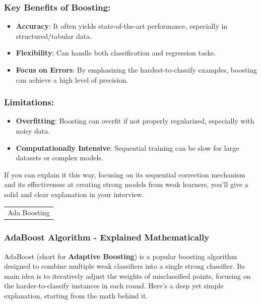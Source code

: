 \documentclass[12pt]{book}
\providecommand{\tightlist}{%
  \setlength{\itemsep}{0pt}\setlength{\parskip}{0pt}}
\begin{document}
\subsubsection{Key Benefits of
Boosting:}\label{key-benefits-of-boosting}

\begin{itemize}
\tightlist
\item
  \textbf{Accuracy}: It often yields state-of-the-art performance,
  especially in structured/tabular data.
\item
  \textbf{Flexibility}: Can handle both classification and regression
  tasks.
\item
  \textbf{Focus on Errors}: By emphasizing the hardest-to-classify
  examples, boosting can achieve a high level of precision.
\end{itemize}

\subsubsection{Limitations:}\label{limitations}

\begin{itemize}
\tightlist
\item
  \textbf{Overfitting}: Boosting can overfit if not properly
  regularized, especially with noisy data.
\item
  \textbf{Computationally Intensive}: Sequential training can be slow
  for large datasets or complex models.
\end{itemize}

If you can explain it this way, focusing on its sequential correction
mechanism and its effectiveness at creating strong models from weak
learners, you'll give a solid and clear explanation in your interview.

\begin{longtable}[]{@{}l@{}}
\toprule\noalign{}
\endhead
\bottomrule\noalign{}
\endlastfoot
Ada Boosting \\
\end{longtable}

\subsubsection{AdaBoost Algorithm - Explained
Mathematically}\label{adaboost-algorithm---explained-mathematically}

AdaBoost (short for \textbf{Adaptive Boosting}) is a popular boosting
algorithm designed to combine multiple weak classifiers into a single
strong classifier. Its main idea is to iteratively adjust the weights of
misclassified points, focusing on the harder-to-classify instances in
each round. Here's a deep yet simple explanation, starting from the math
behind it.
\end{document}
